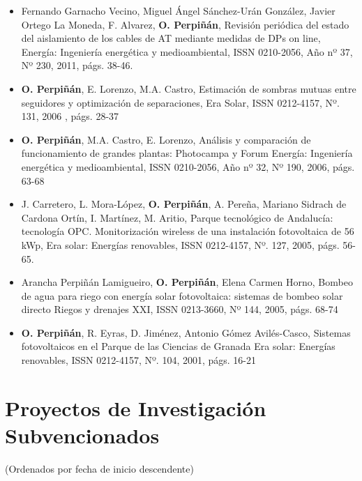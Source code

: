 \documentclass[article, a4paper]{memoir}
\begin{document}
\begin{itemize}
\item Fernando Garnacho Vecino, Miguel Ángel Sánchez-Urán González, Javier Ortego La Moneda, F. Alvarez, \textbf{O. Perpiñán}, Revisión periódica del estado del aislamiento de los cables de AT mediante medidas de DPs on line, Energía: Ingeniería energética y medioambiental, ISSN 0210-2056, Año nº 37, Nº 230, 2011, págs. 38-46.

\item \textbf{O. Perpiñán}, E. Lorenzo, M.A. Castro, Estimación de sombras mutuas entre seguidores y optimización de separaciones, Era Solar, ISSN 0212-4157, Nº. 131, 2006 , págs. 28-37

\item \textbf{O. Perpiñán}, M.A. Castro, E. Lorenzo, Análisis y comparación de funcionamiento de grandes plantas: Photocampa y Forum Energía: Ingeniería energética y medioambiental, ISSN 0210-2056, Año nº 32, Nº 190, 2006, págs. 63-68

\item J. Carretero, L. Mora-López, \textbf{O. Perpiñán}, A. Pereña, Mariano Sidrach de Cardona Ortín, I. Martínez, M. Aritio, Parque tecnológico de Andalucía: tecnología OPC. Monitorización wireless de una instalación fotovoltaica de 56 kWp, Era solar: Energías renovables, ISSN 0212-4157, Nº. 127, 2005, págs. 56-65.

\item Arancha Perpiñán Lamigueiro, \textbf{O. Perpiñán}, Elena Carmen Horno, Bombeo de agua para riego con energía solar fotovoltaica: sistemas de bombeo solar directo Riegos y drenajes XXI, ISSN 0213-3660, Nº 144, 2005, págs. 68-74

\item \textbf{O. Perpiñán}, R. Eyras, D. Jiménez, Antonio Gómez Avilés-Casco, Sistemas fotovoltaicos en el Parque de las Ciencias de Granada Era solar: Energías renovables, ISSN 0212-4157, Nº. 104, 2001, págs. 16-21
\end{itemize}


\section{Proyectos de Investigación Subvencionados}
\label{sec:org3f2c622}
(Ordenados por fecha de inicio descendente)
\end{document}
